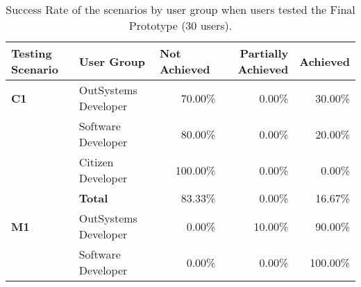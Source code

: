 \begin{table}[tb]
  \caption{Success Rate of the scenarios by user group when users tested the Final Prototype (30 users).}
    \label{tab:effectiveness_final_prototype}
  \begin{tabular}{llrrr}
  \hline
  \rowcolor[HTML]{EFEFEF} 
  \textbf{Testing Scenario} & \textbf{User Group}  & \multicolumn{1}{l}{\cellcolor[HTML]{EFEFEF}\textbf{Not Achieved}} & \multicolumn{1}{C{2cm}}{\cellcolor[HTML]{EFEFEF}\textbf{Partially Achieved}} & \multicolumn{1}{l}{\cellcolor[HTML]{EFEFEF}\textbf{Achieved}} \\ \hline
  \textbf{C1}               & OutSystems Developer & 70.00\%                                                           & 0.00\%                                                                  & 30.00\%                                                       \\
                            & Software Developer   & 80.00\%                                                           & 0.00\%                                                                  & 20.00\%                                                       \\
                            & Citizen Developer    & 100.00\%                                                          & 0.00\%                                                                  & 0.00\%                                                        \\
                            & \textbf{Total}       & 83.33\%                                                           & 0.00\%                                                                  & 16.67\%                                                       \\ \hline
  \textbf{M1}               & OutSystems Developer & 0.00\%                                                            & 10.00\%                                                                 & 90.00\%                                                       \\
                            & Software Developer   & 0.00\%                                                            & 0.00\%                                                                  & 100.00\%                                                      \\

\end{tabular}
\end{table}
